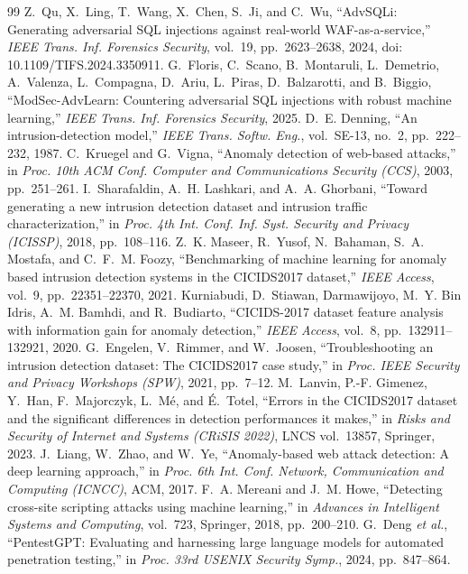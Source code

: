 \documentclass[conference]{IEEEtran}
\begin{document}
\begin{thebibliography}{99}
 Z.~Qu, X.~Ling, T.~Wang, X.~Chen, S.~Ji, and C.~Wu, ``AdvSQLi: Generating adversarial SQL injections against real-world WAF-as-a-service,'' \emph{IEEE Trans. Inf. Forensics Security}, vol.~19, pp.~2623--2638, 2024, doi: 10.1109/TIFS.2024.3350911.
 G.~Floris, C.~Scano, B.~Montaruli, L.~Demetrio, A.~Valenza, L.~Compagna, D.~Ariu, L.~Piras, D.~Balzarotti, and B.~Biggio, ``ModSec-AdvLearn: Countering adversarial SQL injections with robust machine learning,'' \emph{IEEE Trans. Inf. Forensics Security}, 2025.
 D.~E. Denning, ``An intrusion-detection model,'' \emph{IEEE Trans. Softw. Eng.}, vol.~SE-13, no.~2, pp.~222--232, 1987.
 C.~Kruegel and G.~Vigna, ``Anomaly detection of web-based attacks,'' in \emph{Proc. 10th ACM Conf. Computer and Communications Security (CCS)}, 2003, pp.~251--261.
 I.~Sharafaldin, A.~H. Lashkari, and A.~A. Ghorbani, ``Toward generating a new intrusion detection dataset and intrusion traffic characterization,'' in \emph{Proc. 4th Int. Conf. Inf. Syst. Security and Privacy (ICISSP)}, 2018, pp.~108--116.
 Z.~K. Maseer, R.~Yusof, N.~Bahaman, S.~A. Mostafa, and C.~F.~M. Foozy, ``Benchmarking of machine learning for anomaly based intrusion detection systems in the CICIDS2017 dataset,'' \emph{IEEE Access}, vol.~9, pp.~22351--22370, 2021.
 Kurniabudi, D.~Stiawan, Darmawijoyo, M.~Y. Bin Idris, A.~M. Bamhdi, and R.~Budiarto, ``CICIDS-2017 dataset feature analysis with information gain for anomaly detection,'' \emph{IEEE Access}, vol.~8, pp.~132911--132921, 2020.
 G.~Engelen, V.~Rimmer, and W.~Joosen, ``Troubleshooting an intrusion detection dataset: The CICIDS2017 case study,'' in \emph{Proc. IEEE Security and Privacy Workshops (SPW)}, 2021, pp.~7--12.
 M.~Lanvin, P.-F. Gimenez, Y.~Han, F.~Majorczyk, L.~M\'e, and \'E.~Totel, ``Errors in the CICIDS2017 dataset and the significant differences in detection performances it makes,'' in \emph{Risks and Security of Internet and Systems (CRiSIS 2022)}, LNCS vol.~13857, Springer, 2023.
 J.~Liang, W.~Zhao, and W.~Ye, ``Anomaly-based web attack detection: A deep learning approach,'' in \emph{Proc. 6th Int. Conf. Network, Communication and Computing (ICNCC)}, ACM, 2017.
 F.~A. Mereani and J.~M. Howe, ``Detecting cross-site scripting attacks using machine learning,'' in \emph{Advances in Intelligent Systems and Computing}, vol.~723, Springer, 2018, pp.~200--210.
 G.~Deng \emph{et al.}, ``PentestGPT: Evaluating and harnessing large language models for automated penetration testing,'' in \emph{Proc. 33rd USENIX Security Symp.}, 2024, pp.~847--864.

\end{thebibliography}
\end{document}
